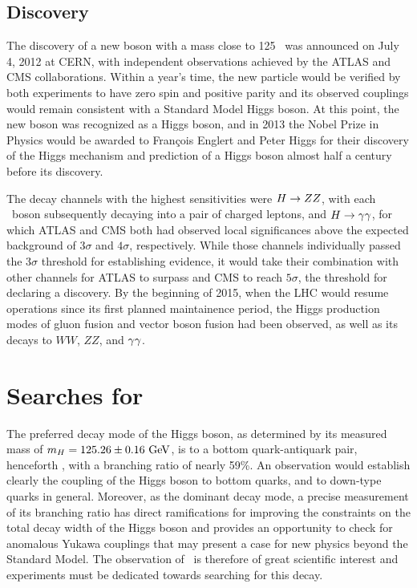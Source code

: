 \subsection{Discovery}

The discovery of a new boson with a mass close to 125 \GeV\ was announced on July 4, 2012 at CERN, with independent observations achieved by the ATLAS\cite{ATLASHiggsDiscovery} and CMS\cite{CMSHiggsDiscovery} collaborations. Within a year's time, the new particle would be verified by both experiments to have zero spin and positive parity\cite{ATLASHiggsVerify,CMSHiggsVerify} and its observed couplings would remain consistent with a Standard Model Higgs boson.\cite{HiggsCouplingConstraints} At this point, the new boson was recognized as a Higgs boson, and in 2013 the Nobel Prize in Physics would be awarded to Fran\c{c}ois Englert and Peter Higgs for their discovery of the Higgs mechanism and prediction of a Higgs boson almost half a century before its discovery.

The decay channels with the highest sensitivities were $H \rightarrow ZZ$, with each \bosZ\ boson subsequently decaying into a pair of charged leptons, and $H \rightarrow \gamma\gamma$, for which ATLAS and CMS both had observed local significances above the expected background of $3\sigma$ and $4\sigma$, respectively. While those channels individually passed the $3\sigma$ threshold for establishing evidence, it would take their combination with other channels for ATLAS to surpass and CMS to reach $5\sigma$, the threshold for declaring a discovery. By the beginning of 2015, when the LHC would resume operations since its first planned maintainence period, the Higgs production modes of gluon fusion and vector boson fusion had been observed, as well as its decays to $WW$, $ZZ$, and $\gamma\gamma$. 

\section{Searches for \VHbb}

The preferred decay mode of the Higgs boson, as determined by its measured mass of $\massH = 125.26 \pm 0.16\ \GeV$\cite{PDG2018}, is to a bottom quark-antiquark pair, henceforth \Hbb, with a branching ratio of nearly 59\%. An observation would establish clearly the coupling of the Higgs boson to bottom quarks, and to down-type quarks in general. Moreover, as the dominant decay mode, a precise measurement of its branching ratio has direct ramifications for improving the constraints on the total decay width of the Higgs boson and provides an opportunity to check for anomalous Yukawa couplings that may present a case for new physics beyond the Standard Model. The observation of \Hbb\ is therefore of great scientific interest and experiments must be dedicated towards searching for this decay.

